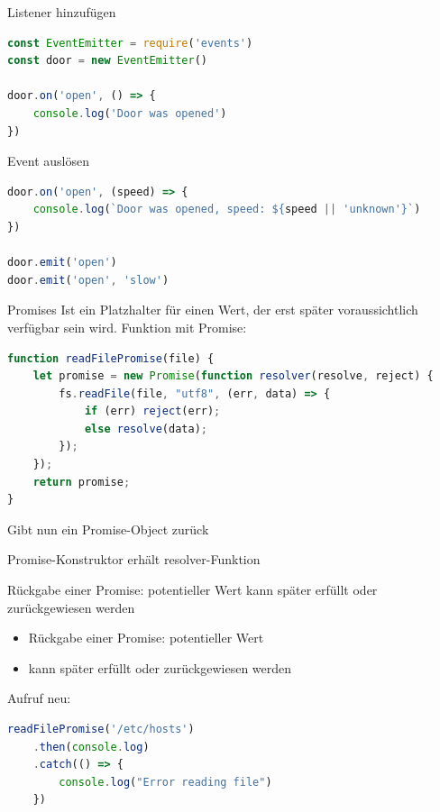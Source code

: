 \begin{definition}{Listener hinzufügen}
\begin{lstlisting}[language=JavaScript, style=base]
const EventEmitter = require('events')
const door = new EventEmitter()

door.on('open', () => {
    console.log('Door was opened')
})
\end{lstlisting}
\end{definition}

\begin{definition}{Event auslösen}
\begin{lstlisting}[language=JavaScript, style=base]
door.on('open', (speed) => {
    console.log(`Door was opened, speed: ${speed || 'unknown'}`)
})

door.emit('open')
door.emit('open', 'slow')
\end{lstlisting}
\end{definition}

\begin{concept}{Promises}
Ist ein Platzhalter für einen Wert, der erst später voraussichtlich verfügbar sein wird.
Funktion mit Promise:
\begin{lstlisting}[language=JavaScript, style=base]
function readFilePromise(file) {
    let promise = new Promise(function resolver(resolve, reject) {
        fs.readFile(file, "utf8", (err, data) => {
            if (err) reject(err);
            else resolve(data);
        });
    });
    return promise;
}
\end{lstlisting}
Gibt nun ein Promise-Object zurück
\end{concept}

\begin{definition}{Promise-Konstruktor erhält resolver-Funktion}

Rückgabe einer Promise: potentieller Wert kann später erfüllt oder zurückgewiesen werden
\begin{itemize}
  \item Rückgabe einer Promise: potentieller Wert
  \item kann später erfüllt oder zurückgewiesen werden
\end{itemize}
Aufruf neu:
\begin{lstlisting}[language=JavaScript, style=base]
readFilePromise('/etc/hosts')
    .then(console.log)
    .catch(() => {
        console.log("Error reading file")
    })
\end{lstlisting}
\end{definition}

